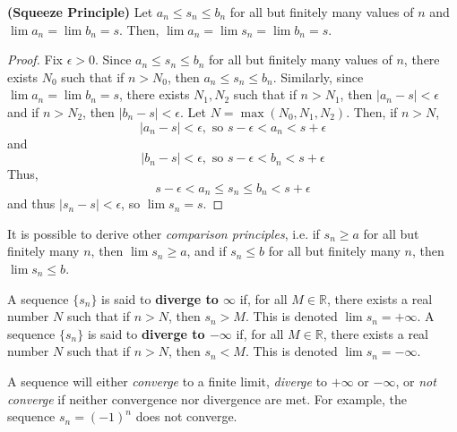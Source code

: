 \begin{theorem*}
    \textbf{(Squeeze Principle)} Let $a_n\leq s_n \leq b_n$ for all but finitely many values of $n$ and $\lim a_n = \lim b_n = s$. Then, $\lim a_n = \lim s_n = \lim b_n = s$.
\end{theorem*}

\begin{proof}
    Fix $\epsilon > 0$. Since $a_n\leq s_n\leq b_n$ for all but finitely many values of $n$, there exists $N_0$ such that if $n>N_0$, then $a_n \leq s_n \leq b_n$. Similarly, since $\lim a_n = \lim b_n = s$, there exists $N_1, N_2$ such that if $n > N_1$, then $|a_n -s| < \epsilon$ and if $n>N_2$, then $|b_n -s| < \epsilon$. Let $N=\max(N_0,N_1,N_2)$. Then, if $n>N$, \[|a_n - s| < \epsilon,\text{ so }s-\epsilon < a_n < s+\epsilon\] and \[|b_n - s| < \epsilon,\text{ so }s-\epsilon < b_n < s+\epsilon\] Thus, \[s-\epsilon < a_n \leq s_n \leq b_n < s+\epsilon\] and thus $|s_n - s| < \epsilon$, so $\lim s_n = s$.
\end{proof}
It is possible to derive other \textit{comparison principles}, i.e. if $s_n\geq a$ for all but finitely many $n$, then $\lim s_n \geq a$, and if $s_n \leq b$ for all but finitely many $n$, then $\lim s_n \leq b$.

\begin{defn}
    A sequence $\{s_n\}$ is said to \textbf{diverge to $\infty$} if, for all $M\in\mathbb{R}$, there exists a real number $N$ such that if $n>N$, then $s_n>M$. This is denoted $\lim s_n = +\infty$. A sequence $\{s_n\}$ is said to \textbf{diverge to $-\infty$} if, for all $M\in\mathbb{R}$, there exists a real number $N$ such that if $n>N$, then $s_n < M$. This is denoted $\lim s_n = -\infty$. 
\end{defn}

A sequence will either \textit{converge} to a finite limit, \textit{diverge} to $+\infty$ or $-\infty$, or \textit{not converge} if neither convergence nor divergence are met. For example, the sequence $s_n = (-1)^n$ does not converge.

